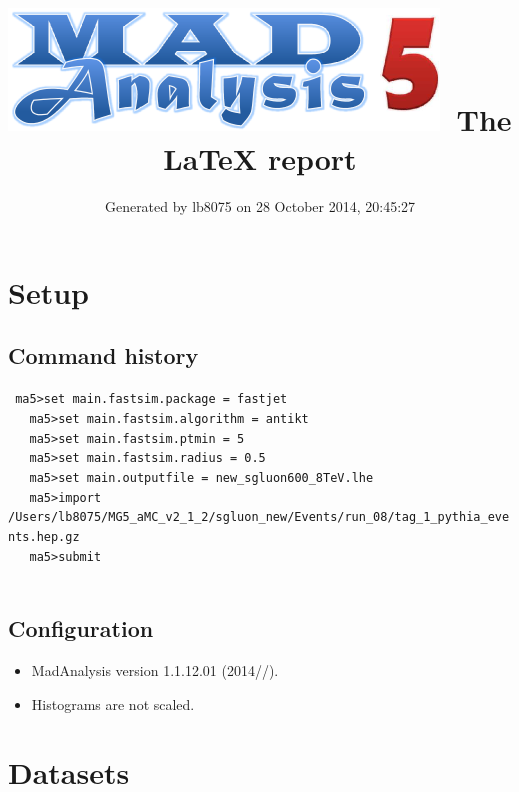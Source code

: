 \documentclass[a4paper, 11pt]{article}
\title{{\includegraphics[scale=.4]{logo.png}}\ The LaTeX report}
\author{Generated by lb8075 on 28 October 2014, 20:45:27}
\begin{document}
\maketitle
\flushbottom

\newpage
\section{ Setup}

\subsection{ Command history}

\texttt{ ma5>set main.fastsim.package = fastjet\\
}
\texttt{ }\texttt{ }\texttt{ ma5>set main.fastsim.algorithm = antikt\\
}
\texttt{ }\texttt{ }\texttt{ ma5>set main.fastsim.ptmin = 5\\
}
\texttt{ }\texttt{ }\texttt{ ma5>set main.fastsim.radius = 0.5\\
}
\texttt{ }\texttt{ }\texttt{ ma5>set main.outputfile = new\_sgluon600\_8TeV.lhe\\
}
\texttt{ }\texttt{ }\texttt{ ma5>import /\-Users/\-lb8075/\-MG5\_aMC\_v2\_1\_2/\-sgluon\_new/\-Events/\-run\_08/\-tag\_1\_pythia\_events.hep.gz\\
}
\texttt{ }\texttt{ }\texttt{ ma5>submit\\
}
\texttt{ }\texttt{ }\subsection{ Configuration}

\begin{itemize}
  \item MadAnalysis version 1.1.12.01 (2014//).
   \item Histograms are not scaled.
 
\end{itemize}
\newpage
\section{ Datasets}
\end{document}
